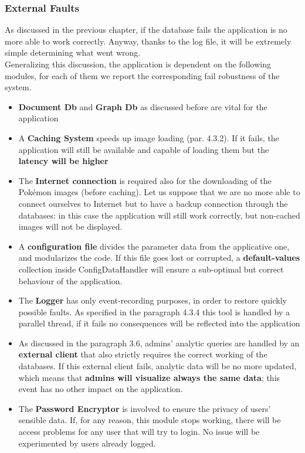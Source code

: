 \subsubsection{External Faults}
As discussed in the previous chapter, if the database fails the application is no more able to work correctly. Anyway, thanks to the log file, it will be extremely simple determining what went wrong.\\
Generalizing this discussion, the application is dependent on the following modules, for each of them we report the corresponding fail robustness of the system.
\begin{itemize}
	\item \textbf{Document Db} and \textbf{Graph Db} as discussed before are vital for the application
	\item A \textbf{Caching System} speeds up image loading (par. 4.3.2). If it fails, the application will still be available and capable of loading them but the \textbf{latency will be higher}
    \item The \textbf{Internet connection} is required also for the downloading of the Pokémon images (before caching). Let us suppose that we are no more able to connect ourselves to Internet but to have a backup connection through the databases: in this case the application will still work correctly, but non-cached images will not be displayed.
	\item A \textbf{configuration file} divides the parameter data from the applicative one, and modularizes the code. If this file goes lost or corrupted, a \textbf{default-values} collection inside ConfigDataHandler will ensure a sub-optimal but correct behaviour of the application.
	\item The \textbf{Logger} has only event-recording purposes, in order to restore quickly possible faults. As specified in the paragraph 4.3.4 this tool is handled by a parallel thread, if it fails no consequences will be reflected into the application
	\item As discussed in the paragraph 3.6, admins’ analytic queries are handled by an \textbf{external client} that also strictly requires the correct working of the databases. 
	If this external client fails, analytic data will be no more updated, which means that \textbf{admins will visualize always the same data}; this event has no other impact on the application.  
	\item The \textbf{Password Encryptor} is involved to ensure the privacy of users’ sensible data. If, for any reason, this module stops working, there will be access problems for any user that will try to login. No issue will be experimented by users already logged.
\end{itemize}
